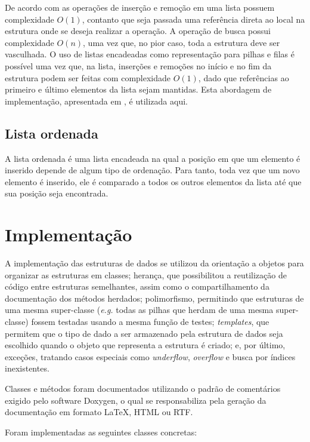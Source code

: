 De acordo com \cite{cormen_introduction_2009} as operações de inserção e remoção em uma lista possuem complexidade \(O(1)\), contanto que seja passada uma referência direta ao local na estrutura onde se deseja realizar a operação. A operação de busca possui complexidade \(O(n)\), uma vez que, no pior caso, toda a estrutura deve ser vasculhada. O uso de listas encadeadas como representação para pilhas e filas é possível uma vez que, na lista, inserções e remoções no início e no fim da estrutura podem ser feitas com complexidade \(O(1)\), dado que referências ao primeiro e último elementos da lista sejam mantidas. Esta abordagem de implementação, apresentada em \cite{deitel_cpp_2012}, é utilizada aqui.

\section{Lista ordenada}

A lista ordenada é uma lista encadeada na qual a posição em que um elemento é inserido depende de algum tipo de ordenação. Para tanto, toda vez que um novo elemento é inserido, ele é comparado a todos os outros elementos da lista até que sua posição seja encontrada.

\chapter{Implementação}

A implementação das estruturas de dados se utilizou da orientação a objetos para organizar as estruturas em classes; herança, que possibilitou a reutilização de código entre estruturas semelhantes, assim como o compartilhamento da documentação dos métodos herdados; polimorfismo, permitindo que estruturas de uma mesma super-classe (\emph{e.g.} todas as pilhas que herdam de uma mesma super-classe) fossem testadas usando a mesma função de testes; \emph{templates}, que permitem que o tipo de dado a ser armazenado pela estrutura de dados seja escolhido quando o objeto que representa a estrutura é criado; e, por último, exceções, tratando casos especiais como \emph{underflow}, \emph{overflow} e busca por índices inexistentes.

Classes e métodos foram documentados utilizando o padrão de comentários exigido pelo software Doxygen, o qual se responsabiliza pela geração da documentação em formato \LaTeX{}, HTML ou RTF.

Foram implementadas as seguintes classes concretas:

